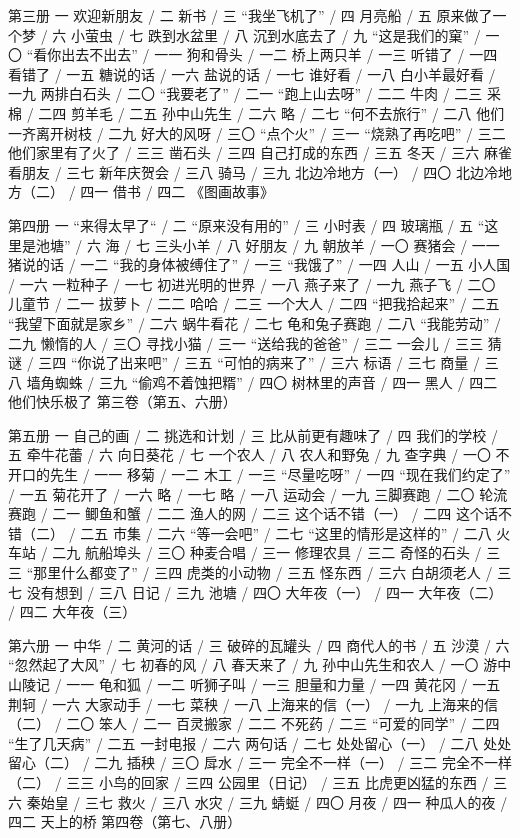 第三册
一 欢迎新朋友 / 二 新书 / 三 “我坐飞机了” / 四 月亮船 / 五 原来做了一个梦 / 六 小萤虫 / 七 跌到水盆里 / 八 沉到水底去了 / 九 “这是我们的窠” / 一〇 “看你出去不出去” / 一一 狗和骨头 / 一二 桥上两只羊 / 一三 听错了 / 一四 看错了 / 一五 糖说的话 / 一六 盐说的话 / 一七 谁好看 / 一八 白小羊最好看 / 一九 两排白石头 / 二〇 “我要老了” / 二一 “跑上山去呀” / 二二 牛肉 / 二三 采棉 / 二四 剪羊毛 / 二五 孙中山先生 / 二六 略 / 二七 “何不去旅行” / 二八 他们一齐离开树枝 / 二九 好大的风呀 / 三〇 “点个火” / 三一 “烧熟了再吃吧” / 三二 他们家里有了火了 / 三三 凿石头 / 三四 自己打成的东西 / 三五 冬天 / 三六 麻雀看朋友 / 三七 新年庆贺会 / 三八 骑马 / 三九 北边冷地方（一） / 四〇 北边冷地方（二） / 四一 借书 / 四二 《图画故事》
 
第四册
一 “来得太早了“ / 二 “原来没有用的” / 三 小时表 / 四 玻璃瓶 / 五 “这里是池塘” / 六 海 / 七 三头小羊 / 八 好朋友 / 九 朝放羊 / 一〇 赛猪会 / 一一 猪说的话 / 一二 “我的身体被缚住了” / 一三 “我饿了” / 一四 人山 / 一五 小人国 / 一六 一粒种子 / 一七 初进光明的世界 / 一八 燕子来了 / 一九 燕子飞 / 二〇 儿童节 / 二一 拔萝卜 / 二二 哈哈 / 二三 一个大人 / 二四 “把我拾起来” / 二五 “我望下面就是家乡” / 二六 蜗牛看花 / 二七 龟和兔子赛跑 / 二八 “我能劳动” / 二九 懒惰的人 / 三〇 寻找小猫 / 三一 “送给我的爸爸” / 三二 一会儿 / 三三 猜谜 / 三四 “你说了出来吧” / 三五 “可怕的病来了” / 三六 标语 / 三七 商量 / 三八 墙角蜘蛛 / 三九 “偷鸡不着蚀把糈” / 四〇 树林里的声音 / 四一 黑人 / 四二 他们快乐极了
第三卷（第五、六册）
 
第五册
一 自己的画 / 二 挑选和计划 / 三 比从前更有趣味了 / 四 我们的学校 / 五 牵牛花蕾 / 六 向日葵花 / 七 一个农人 / 八 农人和野兔 / 九 查字典 / 一〇 不开口的先生 / 一一 移菊 / 一二 木工 / 一三 “尽量吃呀” / 一四 “现在我们约定了” / 一五 菊花开了 / 一六 略 / 一七 略 / 一八 运动会 / 一九 三脚赛跑 / 二〇 轮流赛跑 / 二一 鲫鱼和蟹 / 二二 渔人的网 / 二三 这个话不错（一） / 二四 这个话不错（二） / 二五 市集 / 二六 “等一会吧” / 二七 “这里的情形是这样的” / 二八 火车站 / 二九 航船埠头 / 三〇 种麦合唱 / 三一 修理农具 / 三二 奇怪的石头 / 三三 “那里什么都变了” / 三四 虎类的小动物 / 三五 怪东西 / 三六 白胡须老人 / 三七 没有想到 / 三八 日记 / 三九 池塘 / 四〇 大年夜（一） / 四一 大年夜（二） / 四二 大年夜（三）
 
第六册
一 中华 / 二 黄河的话 / 三 破碎的瓦罐头 / 四 商代人的书 / 五 沙漠 / 六 “忽然起了大风” / 七 初春的风 / 八 春天来了 / 九 孙中山先生和农人 / 一〇 游中山陵记 / 一一 龟和狐 / 一二 听狮子叫 / 一三 胆量和力量 / 一四 黄花冈 / 一五 荆轲 / 一六 大家动手 / 一七 菜秧 / 一八 上海来的信（一） / 一九 上海来的信（二） / 二〇 笨人 / 二一 百灵搬家 / 二二 不死药 / 二三 “可爱的同学” / 二四 “生了几天病” / 二五 一封电报 / 二六 两句话 / 二七 处处留心（一） / 二八 处处留心（二） / 二九 插秧 / 三〇 戽水 / 三一 完全不一样（一） / 三二 完全不一样（二） / 三三 小鸟的回家 / 三四 公园里（日记） / 三五 比虎更凶猛的东西 / 三六 秦始皇 / 三七 救火 / 三八 水灾 / 三九 蜻蜓 / 四〇 月夜 / 四一 种瓜人的夜 / 四二 天上的桥
第四卷（第七、八册）
 
